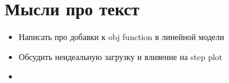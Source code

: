 \section*{Мысли про текст}


\begin{itemize}
	\item Написать про добавки к obj function в линейной модели
	\item Обсудить неидеальную загрузку и влияение на step plot
	\item 
\end{itemize}